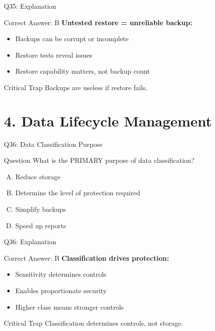 \documentclass{beamer}
\begin{document}
	\begin{frame}{Q35: Explanation}
		\begin{block}{Correct Answer: B}
			\textbf{Untested restore = unreliable backup:}
			\begin{itemize}
				\item Backups can be corrupt or incomplete
				\item Restore tests reveal issues
				\item Restore capability matters, not backup count
			\end{itemize}
		\end{block}
		\begin{alertblock}{Critical Trap}
			Backups are useless if restore fails.
		\end{alertblock}
	\end{frame}
	
	\section{4. Data Lifecycle Management}
	
	\begin{frame}{Q36: Data Classification Purpose}
		\begin{block}{Question}
			What is the PRIMARY purpose of data classification?
		\end{block}
		\begin{enumerate}[(A)]
			\item Reduce storage
			\item Determine the level of protection required
			\item Simplify backups
			\item Speed up reports
		\end{enumerate}
	\end{frame}
	
	\begin{frame}{Q36: Explanation}
		\begin{block}{Correct Answer: B}
			\textbf{Classification drives protection:}
			\begin{itemize}
				\item Sensitivity determines controls
				\item Enables proportionate security
				\item Higher class means stronger controls
			\end{itemize}
		\end{block}
		\begin{alertblock}{Critical Trap}
			Classification determines controls, not storage.
		\end{alertblock}
	\end{frame}
	
\end{document}
